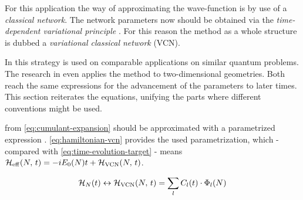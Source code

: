 For this application the way of approximating the wave-function is by use of a \emph{classical network}. 
The network parameters now should be obtained via the \emph{time-dependent variational principle} \cite{originalDerivationTimeDependendVariationalPrinciple}.
For this reason the method as a whole structure is dubbed a \emph{variational classical network} (VCN).

In \cite{variationalClassicalNetworksPaper} this strategy is used on comparable applications on similar quantum problems.
The research in \cite{probabilitySamplingRequirementVCN} even applies the method to two-dimensional geometries.
Both reach the same expressions for the advancement of the parameters to later times.
This section reiterates the equations, unifying the parts where different conventions might be used.

\HNOft from \autoref{eq:cumulant-expansion} should be approximated with a parametrized expression \HvcnOft.
\autoref{eq:hamiltonian-vcn} provides the used parametrization, which - compared with \autoref{eq:time-evolution-target} - means ${\mathcal{H}_\text{eff}}^{}({N},\,t) = -i E_0(N) t + {\mathcal{H}_\text{VCN}}({N},\,t)$.

\begin{equation}
    \label{eq:hamiltonian-vcn}
    \HNOft \leftrightarrow \HvcnOft = \lsum C_l(t) \cdot \Phi_l(N)
\end{equation}


\cite{TDVPcomplexPrefactors} %
\cite{complexDifferentiation} %
\cite{probabilitySamplingRequirementVCN} %
\cite{variationalClassicalNetworksPaper} %

